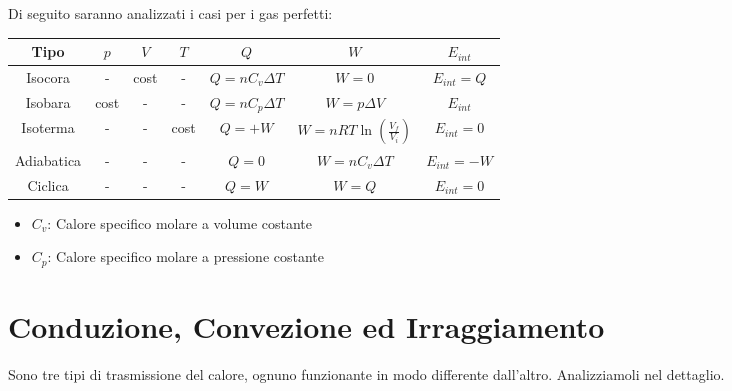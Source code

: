             Di seguito saranno analizzati i casi per i gas perfetti:
            
            \begin{tabular}{ |c|c|c|c|c|c|c| } 
                \hline
                    \textbf{Tipo} & $p$ & $V$ & $T$ & $Q$ & $W$ & $E_{int}$ \\
                \hline
                    Isocora 
                        & - 
                        & cost 
                        & - 
                        & $Q = nC_v\Delta T$ 
                        & $W = 0$
                        & $E_{int} = Q$ \\
                \hline
                    Isobara
                        & cost
                        & - 
                        & - 
                        & $Q = nC_p\Delta T$
                        & $W = p\Delta V$
                        & $E_{int}$ \\
                \hline
                    Isoterma
                        & -
                        & - 
                        & cost
                        & $Q = + W$
                        & $W = nRT\ln(\frac{V_f}{V_i})$
                        & $E_{int} = 0$ \\
                \hline
                    Adiabatica
                        & -
                        & - 
                        & -
                        & $Q = 0$
                        & $W = nC_v\Delta T$
                        & $E_{int} = -W$ \\
                \hline
                    Ciclica
                        & -
                        & - 
                        & -
                        & $Q = W$
                        & $W = Q$
                        & $E_{int} = 0$ \\
                \hline
            \end{tabular}
             
        \begin{itemize}
            \item $C_v$: Calore specifico molare a volume costante
            \item $C_p$: Calore specifico molare a pressione costante
        \end{itemize}

        \section{Conduzione, Convezione ed Irraggiamento} Sono tre tipi di 
        trasmissione del calore, ognuno funzionante in modo differente 
        dall'altro. Analizziamoli nel dettaglio.

